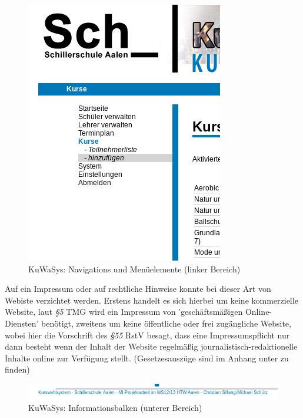 \documentclass[12pt, twoside, a4paper, ngerman]{article}
\begin{document}
\begin{figure}
 \begin{center}
   \includegraphics[scale=0.65]{img/navigation_KuWaSys.png}
 \end{center}
 \caption[\textbf{KuWaSys: Navigations und Menüelemente (linker Bereich)}]{KuWaSys: Navigations und Menüelemente (linker Bereich)}
 \label{fig:navihervorhebung_KuWaSys}
\end{figure}

Auf ein Impressum oder auf rechtliche Hinweise konnte bei dieser Art von Webiste verzichtet werden. 
Erstens handelt es sich hierbei um keine kommerzielle Website, laut \textit{§5} \ac{TMG} wird ein Impressum von 'geschäftsmäßigen Online-Diensten' benötigt, 
 zweitens um keine öffentliche oder frei zugängliche Website, 
wobei hier die Vorschrift des \textit{§55} \ac{RstV} besagt, dass eine Impressumspflicht nur dann besteht wenn der Inhalt der Website regelmäßig journalistisch-redaktionelle Inhalte online zur Verfügung stellt.
(Gesetzesauszüge sind im Anhang unter  zu finden) 

\begin{figure}[h]
 \begin{center}
   \includegraphics[scale=0.7]{img/footer_KuWaSys.png}
 \end{center}
 \caption[\textbf{KuWaSys: Informationsbalken (unterer Bereich)}]{KuWaSys: Informationsbalken (unterer Bereich)}
 \label{fig:footer_KuWaSys}
\end{figure}
\end{document}
